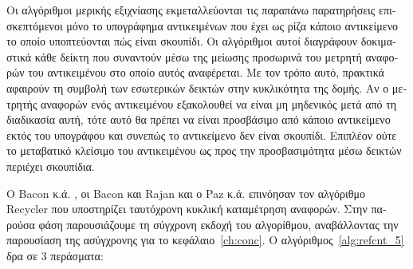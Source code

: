 \begin{greek}
Οι αλγόριθμοι μερικής εξιχνίασης εκμεταλλεύονται τις παραπάνω
παρατηρήσεις επισκεπτόμενοι μόνο το υπογράφημα αντικειμένων
που έχει ως ρίζα κάποιο αντικείμενο το οποίο υποπτεύονται
πώς είναι σκουπίδι. Οι αλγόριθμοι αυτοί διαγράφουν δοκιμαστικά
κάθε δείκτη που συναντούν μέσω της μείωσης προσωρινά του
μετρητή αναφορών του αντικειμένου στο οποίο αυτός αναφέρεται.
Με τον τρόπο αυτό, πρακτικά αφαιρούν τη συμβολή των εσωτερικών
δεικτών στην κυκλικότητα της δομής. Αν ο μετρητής αναφορών ενός
αντικειμένου εξακολουθεί να είναι μη μηδενικός μετά από τη
διαδικασία αυτή, τότε αυτό θα πρέπει να είναι προσβάσιμο από
κάποιο αντικείμενο εκτός του υπογράφου και συνεπώς το αντικείμενο
δεν είναι σκουπίδι. Επιπλέον ούτε το μεταβατικό κλείσιμο του
αντικειμένου ως προς την προσβασιμότητα μέσω δεικτών περιέχει
σκουπίδια.

Ο Bacon κ.ά. \cite{DBLP:conf/pldi/BaconALRS01}, οι Bacon
και Rajan \cite{DBLP:conf/ecoop/BaconR01} και ο Paz κ.ά.
\cite{DBLP:journals/toplas/PazBKPR07} επινόησαν τον αλγόριθμο
Recycler που υποστηρίζει ταυτόχρονη κυκλική καταμέτρηση
αναφορών. Στην παρούσα φάση παρουσιάζουμε τη σύγχρονη εκδοχή
του αλγορίθμου, αναβάλλοντας την παρουσίαση της ασύγχρονης
για το κεφάλαιο~\ref{ch:conc}. Ο αλγόριθμος~\ref{alg:refcnt_5} δρα σε
3 περάσματα:


\end{greek}
